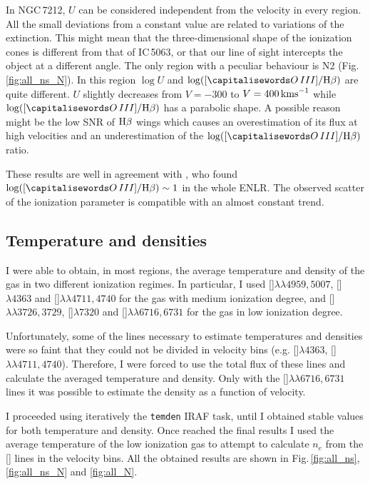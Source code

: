 \documentclass[../main.tex]{subfiles}
\begin{document}
In NGC\,7212, $U$ can be considered independent from the velocity in every region.
All the small deviations from a constant value are related to variations of the extinction.
This might mean that the three-dimensional shape of the ionization cones is different from that of IC\,5063, or that our line of sight intercepts the object at a different angle.
The only region with a peculiar behaviour is N2 (Fig.\,\ref{fig:all_ns_N}).
In this region $\log U$ and $\log([\ion{O}{III}]/\Hb)$ are quite different.
$U$ slightly decreases from $V=-300$ to $V= 400\,\si{\kms}$ while $\log([\ion{O}{III}]/\Hb)$ has a parabolic shape.
A possible reason might be the low SNR of $\Hb$ wings which causes an overestimation of its flux at high velocities and an underestimation of the $\log([\ion{O}{III}]/\Hb)$ ratio.

These results are well in agreement with \citet{Cracco11}, who found $\log([\ion{O}{III}]/\Hb)\sim1$ in the whole ENLR.
The observed scatter of the ionization parameter is compatible with an almost constant trend.



\subsection{Temperature and densities}

I were able to obtain, in most regions, the average temperature and density of the gas in two different ionization regimes.
In particular, I used []$\lambda\lambda4959,5007$, []$\lambda4363$ and  []$\lambda\lambda4711,4740$ for the gas with medium ionization degree, and []$\lambda\lambda3726,3729$, []$\lambda7320$ and  []$\lambda\lambda6716,6731$ for the gas in low ionization degree.

Unfortunately, some of the lines necessary to estimate temperatures and densities were so faint that they could not be divided in velocity bins (e.g. []$\lambda4363$, []$\lambda\lambda4711,4740$).
Therefore, I were forced to use the total flux of these lines and calculate the averaged temperature and density.
Only with the []$\lambda\lambda6716,6731$ lines it was possible to estimate the density as a function of velocity. 

I proceeded using iteratively the \verb!temden! IRAF task, until I obtained stable values for both temperature and density.
Once reached the final results I used the average temperature of the low ionization gas to attempt to calculate $n_e$ from the [] lines in the velocity bins.
All the obtained results are shown in Fig.\,\ref{fig:all_ns}, \ref{fig:all_ns_N} and \ref{fig:all_N}.
\end{document}
